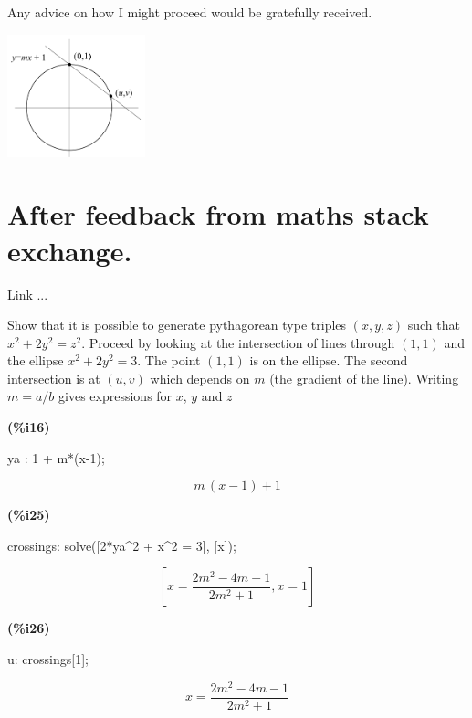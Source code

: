 \documentclass[11pt]{amsart}
\begin{document}
Any advice on how I might proceed would be gratefully received.

\begin{center}
\includegraphics[width=0.3\textwidth]{pics/pythag-triples}
\end{center}

\section{After feedback from maths stack exchange.}

\href{https://math.stackexchange.com/questions/2601414/variant-of-pythagorean-triples}{Link ...}


Show that it is possible to generate pythagorean type triples $(x,y,z)$ such that $x^2 + 2 y^2 = z^2$.  Proceed by looking at the intersection of lines through $(1,1)$ and the ellipse $x^2 + 2 y^2 = 3$. The point $(1,1)$ is on the ellipse. The second intersection is at $(u,v)$ which depends on $m$ (the gradient of the line).  Writing $m = a/b$ gives expressions for $x$, $y$ and $z$ 


\noindent
\begin{minipage}[t]{8ex}\color{red}\bf
(\%{}i16) 
\end{minipage}
\begin{minipage}[t]{\textwidth}\color{blue}
ya : 1 + m*(x-1);
\end{minipage}
\[\displaystyle
\tag{ya}\label{ya}
m\,\left( x-1\right) +1\mbox{}
\]



\noindent
\begin{minipage}[t]{8ex}\color{red}\bf
(\%{}i25) 
\end{minipage}
\begin{minipage}[t]{\textwidth}\color{blue}
crossings: solve([2*ya\^{}2 + x\^{}2 = 3], [x]);
\end{minipage}
\[\displaystyle
\tag{crossings}\label{crossings}
[x=\frac{2{{m}^{2}}-4m-1}{2{{m}^{2}}+1},x=1]\mbox{}
\]


\noindent
\begin{minipage}[t]{8ex}\color{red}\bf
(\%{}i26) 
\end{minipage}
\begin{minipage}[t]{\textwidth}\color{blue}
u: crossings[1];
\end{minipage}
\[\displaystyle
\tag{u}\label{u}
x=\frac{2{{m}^{2}}-4m-1}{2{{m}^{2}}+1}\mbox{}
\]
\end{document}
